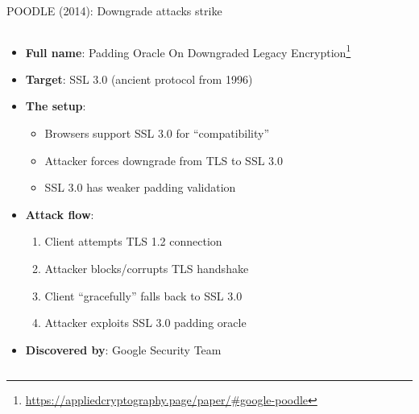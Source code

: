 \documentclass[aspectratio=169, lualatex, handout]{beamer}
\begin{document}
\begin{frame}{POODLE (2014): Downgrade attacks strike}
	\begin{columns}[c]
		\begin{column}{1\textwidth}
			\begin{itemize}[<+->]
				\item \textbf{Full name}: Padding Oracle On Downgraded Legacy Encryption\footnote{\url{https://appliedcryptography.page/paper/\#google-poodle}}
				\item \textbf{Target}: SSL 3.0 (ancient protocol from 1996)
				\item \textbf{The setup}:
				      \begin{itemize}
					      \item Browsers support SSL 3.0 for ``compatibility''
					      \item Attacker forces downgrade from TLS to SSL 3.0
					      \item SSL 3.0 has weaker padding validation
				      \end{itemize}
				\item \textbf{Attack flow}:
				      \begin{enumerate}
					      \item Client attempts TLS 1.2 connection
					      \item Attacker blocks/corrupts TLS handshake
					      \item Client ``gracefully'' falls back to SSL 3.0
					      \item Attacker exploits SSL 3.0 padding oracle
				      \end{enumerate}
				\item \textbf{Discovered by}: Google Security Team
			\end{itemize}
		\end{column}
	\end{columns}
\end{frame}
\end{document}
